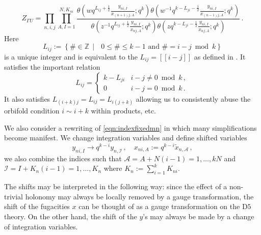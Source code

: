 \documentclass[main.tex]{subfiles}
\begin{document}
\begin{equation}
Z_{\Gamma U}=\prod_{n,i,j}\prod_{A,I=1}^{N,K_{ni}}\frac{\theta\left(wq^{L_{ij}+\frac{1}{2}}\frac{y_{ni,I}}{x_{(n+1)j,A}};q^k\right)\theta\left(w^{-1}q^{k-L_{ji}-\frac{1}{2}}\frac{y_{ni,I}}{x_{(n-1)j,A}};q^k\right)}{\theta\left(z^{-1}q^{L_{ij}+\frac{1}{2}}\frac{y_{ni,I}}{x_{nj,A}};q^k\right)\theta\left(zq^{k-L_{ji}-\frac{1}{2}}\frac{y_{ni,I}}{x_{nj,A}};q^k\right)}\,.
\end{equation}
Here 
\begin{equation}\label{eqn:Ljv}
L_{ij}:=\left\{
\#\in\mathbb{Z} \,\middle|\text{ $0\leq \#\leq k-1$ and $\#=i-j\bmod k$}\right\}
\end{equation} 
is a unique integer and is equivalent to the $L_{ij}=[[i-j]]$ as defined in \cite{Benini:2011nc}. It satisfies the important relation 
\begin{equation}\label{eqn:usefulid}
L_{ij}=\begin{cases}
k-L_{ji} & \text{$i-j\neq0\bmod k$}\,,\\
0&\text{$i-j=0\bmod k$}\,.
\end{cases}
\end{equation} 
It also satisfies $L_{(i+k)j}=L_{ij}=L_{i(j+k)}$ allowing us to consistently abuse the orbifold condition $i\sim i+k$ within products, etc.

We also consider a rewriting of \eqref{eqn:indexfixedmn} in which many simplifications become manifest. We change integration variables and define shifted variables
\begin{equation}\label{eqn:gaugetrans}
y_{ni,I}\to q^{k-i}y_{n,\mathcal{I}}\,,\quad x_{ni,A}:=q^{k-i}\tilde{x}_{n,\mathcal{A}}\,,
\end{equation} 
we also combine the indices such that $\mathcal{A}=A+N(i-1)=1,\dots,kN$ and $\mathcal{I}=I+K_n(i-1)=1,\dots,K_n$ where $K_n:=\sum_{i=1}^kK_{ni}$.

The shifts may be interpreted in the following way: since the effect of a non-trivial holonomy may always be locally removed by a gauge transformation, the shift of the fugacities $x$ can be thought of as a gauge transformation on the D$5$ theory. On the other hand, the shift of the $y$'s may always be made by a change of integration variables.
\end{document}
